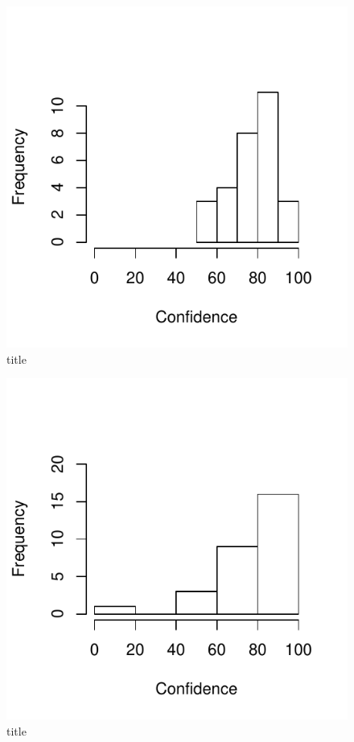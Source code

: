 \begin{figure}
  \centering
  \includegraphics{images/histLowGroupConfidence-1}
  \caption{title}
  \label{fig:histLowGroupConfidence}
\end{figure}


\begin{figure}
  \centering
  \includegraphics{images/histHighIndConfidence-1}
  \caption{title}
  \label{}
\end{figure}


